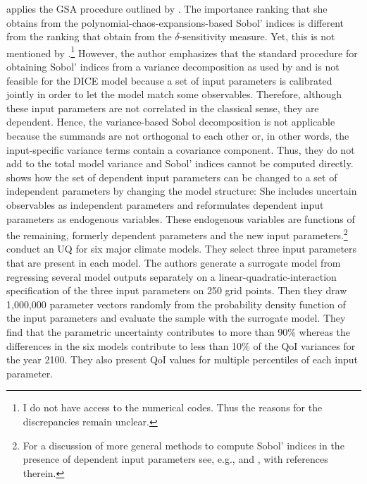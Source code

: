 \cite{Miftakhova.2018} applies the GSA procedure outlined by \cite{Harenberg.2019}. The importance ranking that she obtains from the polynomial-chaos-expansions-based Sobol' indices is different from the ranking that \cite{Anderson.2014} obtain from the $\delta$-sensitivity measure. Yet, this is not mentioned by \citeauthor{Miftakhova.2018}.\footnote{I do not have access to the numerical codes. Thus the reasons for the discrepancies remain unclear.} However, the author emphasizes that the standard procedure for obtaining Sobol' indices from a variance decomposition as used by \cite{Anderson.2014} and \cite{Butler.2014} is not feasible for the DICE model because a set of input parameters is calibrated jointly in order to let the model match some observables. Therefore, although these input parameters are not correlated in the classical sense, they are dependent. Hence, the variance-based Sobol decomposition is not applicable because the summands are not orthogonal to each other or, in other words, the input-specific variance terms contain a covariance component. Thus, they do not add to the total model variance and Sobol' indices cannot be computed directly. \cite{Miftakhova.2018} shows how the set of dependent input parameters can be changed to a set of independent parameters by changing the model structure: She includes uncertain observables as independent parameters and reformulates dependent input parameters as endogenous variables. These endogenous variables are functions of the remaining, formerly dependent parameters and the new input parameters.\footnote{For a discussion of more general methods to compute Sobol' indices in the presence of dependent input parameters see, e.g., \cite{Chastaing.2015} and \cite{Wiederkehr.2018}, with references therein.}\\
\newline
\cite{Gillingham.2015} conduct an UQ for six major climate models. They select three input parameters that are present in each model. The authors generate a surrogate model from regressing several model outputs separately on a linear-quadratic-interaction specification of the three input parameters on 250 grid points. Then they draw 1,000,000 parameter vectors randomly from the probability density function of the input parameters and evaluate the sample with the surrogate model. They find that the parametric uncertainty contributes to more than 90\% whereas the differences in the six models contribute to less than 10\% of the QoI variances for the year 2100. They also present QoI values for multiple percentiles of each input parameter.\\
